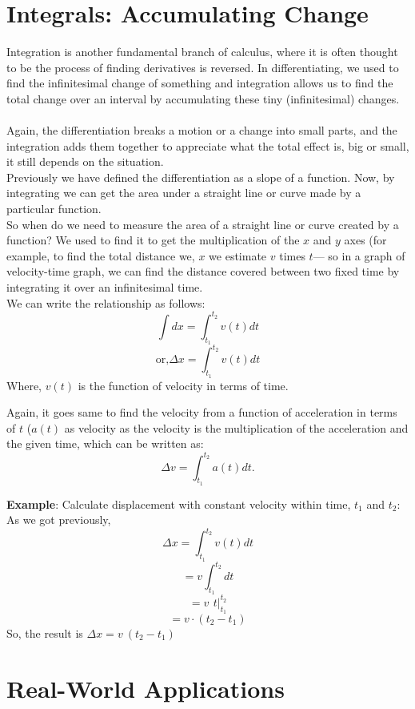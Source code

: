 \documentclass[12pt,a4paper]{article}
\begin{document}
\section*{Integrals: Accumulating Change}
Integration is another fundamental branch of calculus, where it is often thought to be the process of finding derivatives is reversed. In differentiating, we used to find the infinitesimal change of something and integration allows us to find the total change over an interval by accumulating these tiny (infinitesimal) changes.\\\\
   Again, the differentiation breaks a motion or a change into small parts, and the integration adds them together to appreciate what the total effect is, big or small, it still depends on the situation.\\
 Previously we have defined the differentiation as a slope of a function. Now, by integrating we can get the area under a straight line or curve made by a particular function.\\
 So when do we need to measure the area of a straight line or curve created by a function? We used to find it to get the multiplication of the $x$ and $y$ axes (for example, to find the total distance we, $x$ we estimate $v$ times $t$--- so in a graph of velocity-time graph, we can find the distance covered between two fixed time by integrating it over an infinitesimal time.\\
 We can write the relationship as follows:
 \[
 \int dx =\int_{t_1}^{t_2}v(t)dt   
 \]
  \[\text{or,}\Delta x = \int_{t_1}^{t_2}v(t)dt \] 
  Where, $v(t)$ is the function of velocity in terms of time.

  Again, it goes same to find the velocity from a function of acceleration in terms of $t$ ($a(t)$ as velocity as the velocity is the multiplication of the acceleration and the given time, which can be written as:
  \[\Delta v = \int_{t_1}^{t_2} a(t) dt.\]

\textbf{Example}: Calculate displacement with constant velocity within time, $t_1$ and $t_2$:\\
As we got previously,
\[ \Delta x =\int_{t_1}^{t_2}v(t)dt\]
\[= v \int_{t_1}^{t_2}dt \]
\[=v\  \, t\bigg|_{t_1}^{t_2}  \]
\[=v \cdot (t_2-t_1) \]
So, the result is $\Delta x = v\ (t_2-t_1)$ 


\section*{Real-World Applications}
\end{document}
